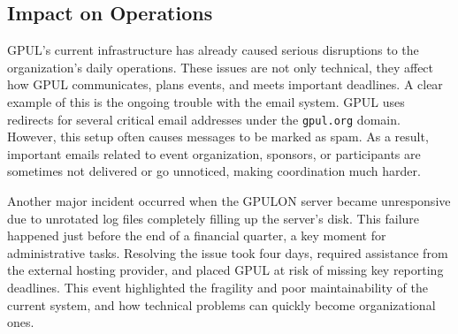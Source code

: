\subsection*{Impact on Operations}

GPUL's current infrastructure has already caused serious disruptions to the organization's daily operations. These issues are not only technical, they affect how GPUL communicates, plans events, and meets important deadlines. A clear example of this is the ongoing trouble with the email system. GPUL uses redirects for several critical email addresses under the \texttt{gpul.org} domain. However, this setup often causes messages to be marked as spam. As a result, important emails related to event organization, sponsors, or participants are sometimes not delivered or go unnoticed, making coordination much harder.

Another major incident occurred when the GPULON server became unresponsive due to unrotated log files completely filling up the server's disk. This failure happened just before the end of a financial quarter, a key moment for administrative tasks. Resolving the issue took four days, required assistance from the external hosting provider, and placed GPUL at risk of missing key reporting deadlines. This event highlighted the fragility and poor maintainability of the current system, and how technical problems can quickly become organizational ones.
